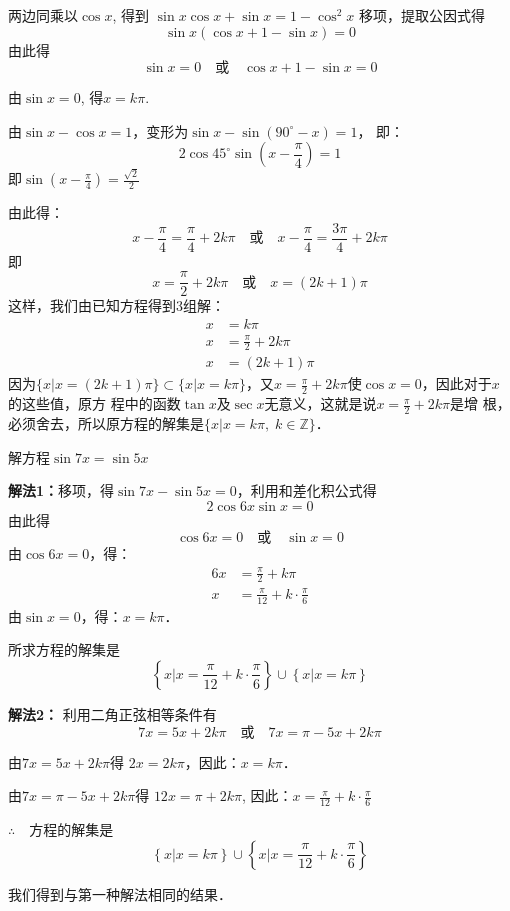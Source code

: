 \begin{solution}
两边同乘以$\cos x$, 得到
$\sin x\cos x+\sin x=1-\cos^2x$
移项，提取公因式得
\[\sin x(\cos x +1-\sin x)=0\]
由此得
\[\sin x=0\quad  \text{或}\quad \cos x+1-\sin x=0\]

由$\sin x=0$, 得$x=k\pi$. 

由$\sin x-\cos x=1$，变形为$\sin x-\sin(90^{\circ}-x)=1$，
即：
\[2\cos45^{\circ} \sin\left(x-\frac{\pi}{4}\right)=1\]
即$\sin\left(x-\frac{\pi}{4}\right)=\frac{\sqrt{2}}{2}$

由此得：
\[x-\frac{\pi}{4}=\frac{\pi}{4}+2k\pi\quad  \text{或}\quad x-\frac{\pi}{4}=\frac{3\pi}{4}+2k\pi\]
即
\[x=\frac{\pi}{2}+2k\pi\quad  \text{或}\quad x=(2k+1)\pi\]
这样，我们由已知方程得到3组解：
\begin{align}
    x&=k\pi\\
    x&=\frac{\pi}{2}+2k\pi\\
    x&=(2k+1)\pi
\end{align}
因为$\{x|x=(2k+1)\pi\}\subset \{x|x=k\pi\}$，又$x=\frac{\pi}{2}+2k\pi$使$\cos x=0$，因此对于$x$的这些值，原方
程中的函数$\tan x$及$\sec x$无意义，这就是说$x=\frac{\pi}{2}+2k\pi$是增
根，必须舍去，所以原方程的解集是$\{x|x=k\pi,\; k\in\mathbb{Z}\}$．
\end{solution}

\begin{example}
    解方程$\sin7x=\sin5x$
\end{example}

\begin{solution}    
\textbf{解法1：}移项，得$\sin7x-\sin5x=0$，利用和差化积公式得
\[2\cos6x\sin x=0\]
由此得
\[\cos6x=0\quad  \text{或}\quad \sin x=0\]
由$\cos6x=0$，得：
\[\begin{split}
    6x&=\frac{\pi}{2}+k\pi\\
    x&=\frac{\pi}{12}+k\cdot \frac{\pi}{6}
\end{split} \]
由$\sin x=0$，得：$x=k\pi$．
    
所求方程的解集是
\[\left\{x\big|x=\frac{\pi}{12}+k\cdot \frac{\pi}{6}\right\}\cup\left\{x\big|x=k\pi\right\} \]
    
\textbf{解法2：} 利用二角正弦相等条件有
\[7x=5x+2k\pi \quad \text{或}\quad 7x=\pi -5x+2k\pi \]

由$7x=5x+2k\pi$得 $2x=2k\pi$，因此：$x=k\pi$．

由$7x=\pi -5x+2k\pi$得
$12x=\pi +2k\pi$, 因此：$x=\frac{\pi}{12}+k\cdot \frac{\pi}{6}$

$\therefore\quad $方程的解集是
\[\left\{x\big|x=k\pi\right\}\cup\left\{x\big|x=\frac{\pi}{12}+k\cdot \frac{\pi}{6}\right\} \]

我们得到与第一种解法相同的结果．
\end{solution}


